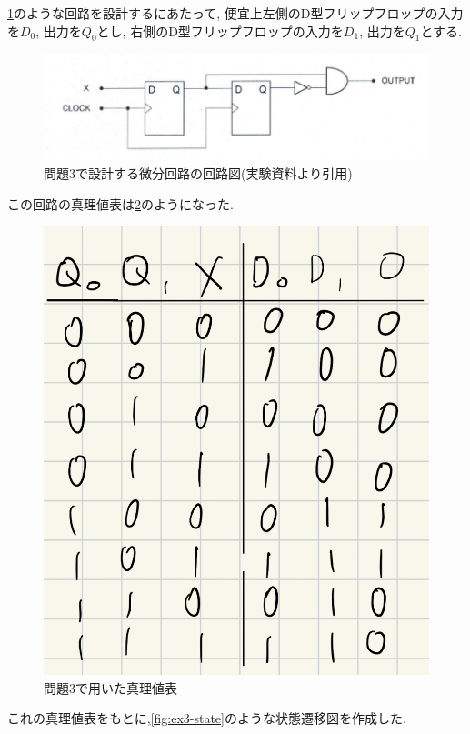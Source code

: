 \documentclass[autodetect-engine, dvi=dvipdfmx, 10pt, a4paper, ja=standard]{bxjsarticle}
\begin{document}
\ref{fig:ex3}のような回路を設計するにあたって,
便宜上左側のD型フリップフロップの入力を$D_0$, 出力を$Q_0$とし,
右側のD型フリップフロップの入力を$D_1$, 出力を$Q_1$とする.

\begin{figure}[htbp]
	\centering
	\includegraphics[width=\columnwidth]{asset/ex3_notebook.png}
	\caption{問題3で設計する微分回路の回路図(実験資料より引用)}
	\label{fig:ex3}
\end{figure}

この回路の真理値表は\ref{fig:ex3-tf}のようになった.

\begin{figure}[H]
	\centering
	\includegraphics[width=0.8\columnwidth]{asset/ex3_tf.png}
	\caption{問題3で用いた真理値表}
	\label{fig:ex3-tf}
\end{figure}

これの真理値表をもとに,\ref{fig:ex3-state}のような状態遷移図を作成した.
\end{document}
